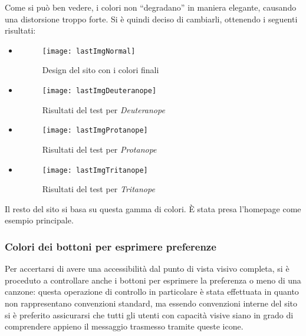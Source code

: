 Come si può ben vedere, i colori non ``degradano'' in maniera elegante, causando una distorsione troppo forte. Si è quindi deciso di cambiarli, ottenendo i seguenti risultati:
\begin{itemize}

    \item[]
       \begin{figure}[H]

            \centering
            \texttt{[image: lastImgNormal]}
            \caption{Design del sito con i colori finali}
        \end{figure}

    \item[]
        \begin{figure}[H]

            \centering
            \texttt{[image: lastImgDeuteranope]}
            \caption{Risultati del test per \textit{Deuteranope}}
        \end{figure}

    \item[]
        \begin{figure}[H]

            \centering
            \texttt{[image: lastImgProtanope]}
            \caption{Risultati del test per \textit{Protanope}}
        \end{figure}

    \item[]
        \begin{figure}[H]

            \centering
            \texttt{[image: lastImgTritanope]}
            \caption{Risultati del test per \textit{Tritanope}}
        \end{figure}

\end{itemize}

Il resto del sito si basa su questa gamma di colori. \`E stata presa l'homepage come esempio principale.

\subsubsection{Colori dei bottoni per esprimere preferenze}
Per accertarsi di avere una accessibilit\`a dal punto di vista visivo completa, si \`e proceduto a controllare anche i bottoni per esprimere la preferenza o meno di una canzone: questa operazione di controllo in particolare \`e stata effettuata in quanto non rappresentano convenzioni standard, ma essendo convenzioni interne del sito si \`e preferito assicurarsi che tutti gli utenti con capacit\`a visive siano in grado di comprendere appieno il messaggio trasmesso tramite queste icone.

